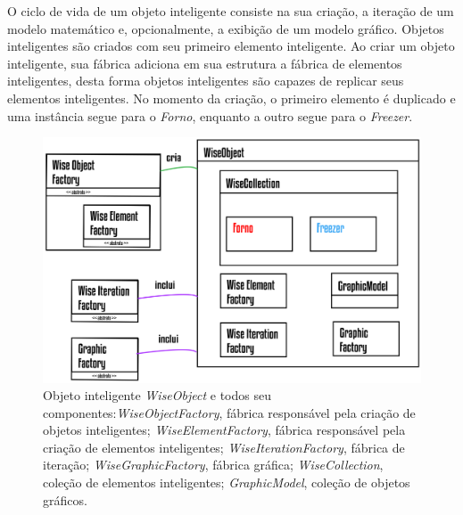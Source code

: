
O ciclo de vida de um objeto inteligente consiste na sua criação, a iteração de um modelo matemático e, opcionalmente, a exibição de um modelo gráfico. Objetos inteligentes são criados com seu primeiro elemento inteligente. Ao criar um objeto inteligente, sua fábrica adiciona em sua estrutura a fábrica de elementos inteligentes, desta forma objetos inteligentes são capazes de replicar seus elementos inteligentes. No momento da criação, o primeiro elemento é duplicado e uma instância segue para o \textit{Forno}, enquanto a outro segue para o \textit{Freezer}.

\begin{figure}[!htbp]
	\centering
	\includegraphics[scale=1.15]{Figures/WiseObject@16x.png}
	\caption{Objeto inteligente \textit{WiseObject} e todos seu componentes:\textit{WiseObjectFactory}, fábrica responsável pela criação de objetos inteligentes; \textit{WiseElementFactory}, fábrica responsável pela criação de elementos inteligentes; \textit{WiseIterationFactory}, fábrica de iteração; \textit{WiseGraphicFactory}, fábrica gráfica; \textit{WiseCollection}, coleção de elementos inteligentes; \textit{GraphicModel}, coleção de objetos gráficos.}
	\label{fig7:wiseobject}
\end{figure}

